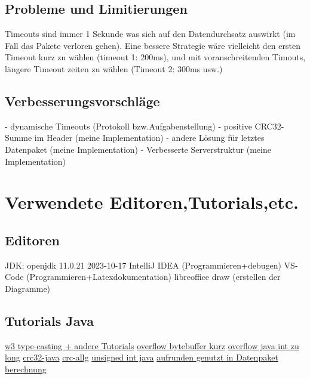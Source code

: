\documentclass {article}[a4paper,12pt]
\begin{document}
\subsection{Probleme und Limitierungen}

Timeouts sind immer 1 Sekunde was sich auf den Datendurchsatz auswirkt (im Fall das Pakete verloren gehen).
Eine bessere Strategie  wäre  vielleicht den ersten Timeout kurz zu wählen (timeout 1: 200ms),
und mit voranschreitenden Timouts, längere Timeout zeiten zu wählen (Timeout 2: 300ms usw.)
\newline
\subsection{Verbesserungsvorschläge}
- dynamische Timeouts            (Protokoll bzw.Aufgabenstellung)
\newline
- positive CRC32-Summe im Header (meine Implementation)
\newline
- andere Lösung für  letztes  Datenpaket (meine Implementation)
\newline
- Verbesserte Serverstruktur (meine Implementation)
 
\section{Verwendete Editoren,Tutorials,etc.}

\subsection{Editoren}
JDK: openjdk 11.0.21 2023-10-17
\newline
IntelliJ IDEA (Programmieren+debugen)
\newline
VS-Code (Programmieren+Latexdokumentation)
\newline
libreoffice draw (erstellen der Diagramme)

\subsection{Tutorials Java}
\href{https://www.w3schools.com/java/java_type_casting.asp}{w3 type-casting + andere Tutorials}
\newline
\href{https://stackoverflow.com/questions/6255768/java-how-create-a-package-with-bytes}{overflow bytebuffer kurz}
\newline
\href{https://stackoverflow.com/questions/9578639/best-way-to-convert-a-signed-integer-to-an-unsigned-long}{overflow java int zu long}
\newline
\href{https://docs.oracle.com/javase/8/docs/api/java/util/zip/Checksum.html}{crc32-java}
\newline
\href{https://kryptografie.de/kryptografie/chiffre/crc-32.htm}{crc-allg}
\newline
\href{https://stackoverflow.com/questions/9854166/declaring-an-unsigned-int-in-java}{unsigned int java}
\newline
\href{https://www.java-blog-buch.de/11-02-mathematisches-mit-java-lang-math/}{aufrunden genutzt in Datenpaket berechnung}
\end{document}
